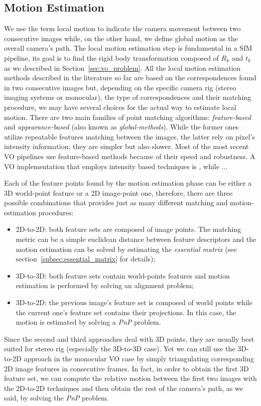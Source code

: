 \subsection{Motion Estimation}
We use the term local motion to indicate the camera movement between two 
consecutive images while, on the other hand, we define global motion as
the overall camera's path.
The local motion estimation step is fundamental in a SfM pipeline, its goal is 
to find the rigid body transformation composed of $R_k$ and $t_k$ as we 
described in Section~\ref{sec:vo_problem}.
All the local motion estimation methods described in the literature so far are 
based on the correspondences found in two consecutive images but, depending on the
specific camera rig (stereo imaging systems or monocular), the type of 
correspondences and their matching procedure, we may have several choices for
the actual way to estimate local motion.
There are two main families of point matching algorithms: \textit{feature-based}
and \textit{appearance-based} (also known as \textit{global-methods}).
While the former ones utilize repeatable features 
matching between the images, the latter rely on pixel's intensity information; 
they are simpler but also slower. Most of the 
most recent VO pipelines use feature-based methods because of
their speed and robustness.
A VO implementation that employs intensity based techniques is 
\cite{nister2004visual}, while ...

Each of the feature points found by the motion estimation phase can be 
either a 3D world-point feature or a 2D image-point one,
therefore, there are three possible combinations that provides just as many 
different matching and motion-estimation procedures:
\begin{itemize}
	\item 2D-to-2D: both feature sets are composed of image points.
The matching metric can be a simple euclidean distance between feature 
descriptors and the motion estimation can be solved by estimating the 
\textit{essential matrix} (see section~\ref{subsec:essential_matrix} for 
details);
	\item 3D-to-3D: both feature sets contain world-points features and motion
estimation is performed by solving an alignment problem;
	\item 3D-to-2D: the previous image's feature set is composed of world points while
the current one's feature set contains their projections. In this case, the motion 
is estimated by solving a \textit{PnP} problem.
\end{itemize}
Since the second and third approaches deal with 3D points, they are usually 
best suited for stereo rig (especially the 3D-to-3D case).
Yet we can still use the 3D-to-2D approach in the monocular VO case by simply 
triangulating corresponding 2D image features in consecutive frames.
In fact, in order to obtain the first 3D feature set,
we can compute the relative motion between the first two images with 
the 2D-to-2D techniques and then obtain the rest of the camera's path,
as we said, by solving the \textit{PnP} problem.

